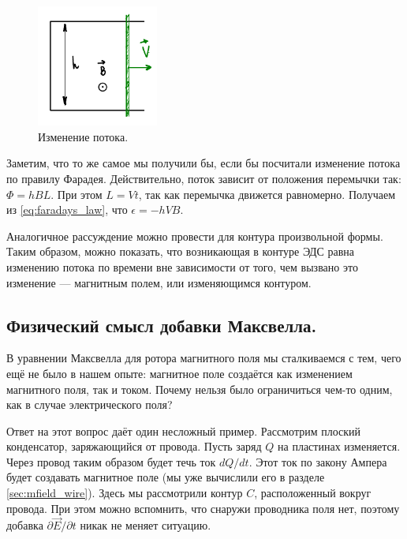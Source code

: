 \documentclass[12pt,a4paper]{article}
\numberwithin{equation}{section}
\numberwithin{equation}{section}
\newcommand{\pt}{\partial}
\newcommand{\eps}{\epsilon}
\begin{document}
\begin{figure}
  \vspace{-1cm}
  \begin{center}
  \includegraphics[width=4cm]{faraday.pdf}  
  \end{center}
  \caption{Изменение потока.}
  \label{fig:faraday}
  \vspace{-1cm}
\end{figure}

Заметим, что то же самое мы получили бы, если бы посчитали изменение
потока по правилу Фарадея. Действительно, поток зависит от положения
перемычки так: $\Phi = h B L$. При этом $L=Vt$, так как перемычка
движется равномерно. Получаем из \eqref{eq:faradays_law}, что $\eps =
-h VB$.

Аналогичное рассуждение можно провести для контура произвольной
формы. Таким образом, можно показать, что возникающая в контуре ЭДС
равна изменению потока по времени вне зависимости от того, чем вызвано
это изменение --- магнитным полем, или изменяющимся контуром. 

\subsection{Физический смысл добавки Максвелла. }
\label{sec:physical_sense_maxwell}

В уравнении Максвелла для ротора магнитного поля мы сталкиваемся с
тем, чего ещё не было в нашем опыте: магнитное поле создаётся как
изменением магнитного поля, так и током. Почему нельзя было
ограничиться чем-то одним, как в случае электрического поля? 

Ответ на этот вопрос даёт один несложный пример. Рассмотрим плоский
конденсатор, заряжающийся от провода. Пусть заряд $Q$ на пластинах
изменяется. Через провод таким образом будет течь ток $dQ/dt$. Этот
ток по закону Ампера будет создавать магнитное поле (мы уже вычислили
его в разделе \ref{sec:mfield_wire}). Здесь мы рассмотрили контур $C$,
расположенный вокруг провода. При этом можно вспомнить, что снаружи
проводника поля нет, поэтому добавка $\pt \vec{E}/\pt t$ никак не
меняет ситуацию.
\end{document}
